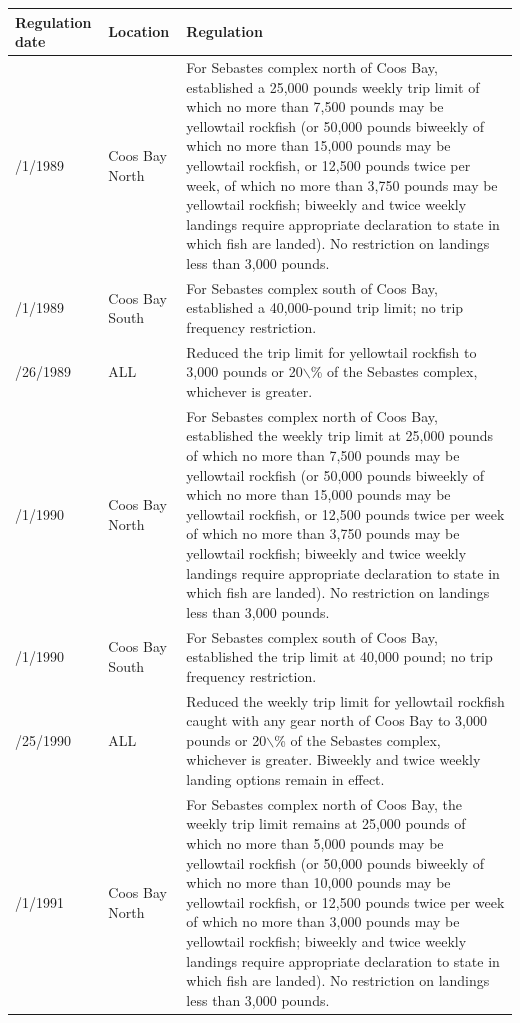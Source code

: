 \documentclass[12pt,]{article}
\begin{document}
\begin{tabular}{>{\centering}p{.60in}>{\centering}p{1.0in}>{\raggedright}p{4.20in}}
  \hline
Regulation date & Location & Regulation \\ 
  \hline
1/1/1989 & Coos Bay North & For Sebastes complex north of Coos Bay, established a 25,000 pounds weekly trip limit of which no more than 7,500 pounds may be yellowtail rockfish (or 50,000 pounds biweekly of which no more than 15,000 pounds may be yellowtail rockfish, or 12,500 pounds twice per week, of which no more than 3,750 pounds may be yellowtail rockfish; biweekly and twice weekly landings require appropriate declaration to state in which fish are landed). No restriction on landings less than 3,000 pounds.  \\ 
  1/1/1989 & Coos Bay South & For Sebastes complex south of Coos Bay, established a 40,000-pound trip limit; no trip frequency restriction.  \\ 
  7/26/1989 & ALL & Reduced the trip limit for yellowtail rockfish to 3,000 pounds or 20$\backslash$\% of the Sebastes complex, whichever is greater.  \\ 
  1/1/1990 & Coos Bay North & For Sebastes complex north of Coos Bay, established the weekly trip limit at 25,000 pounds of which no more than 7,500 pounds may be yellowtail rockfish (or 50,000 pounds biweekly of which no more than 15,000 pounds may be yellowtail rockfish, or 12,500 pounds twice per week of which no more than 3,750 pounds may be yellowtail rockfish; biweekly and twice weekly landings require appropriate declaration to state in which fish are landed).  No restriction on landings less than 3,000 pounds. \\ 
  1/1/1990 & Coos Bay South & For Sebastes complex south of Coos Bay, established the trip limit at 40,000 pound; no trip frequency restriction. \\ 
  7/25/1990 & ALL & Reduced the weekly trip limit for yellowtail rockfish caught with any gear north of Coos Bay to 3,000 pounds or 20$\backslash$\% of the Sebastes complex, whichever is greater.  Biweekly and twice weekly landing options remain in effect. \\ 
  1/1/1991 & Coos Bay North & For Sebastes complex north of Coos Bay, the weekly trip limit remains at 25,000 pounds of which no more than 5,000 pounds may be yellowtail rockfish (or 50,000 pounds biweekly of which no more than 10,000 pounds may be yellowtail rockfish, or 12,500 pounds twice per week of which no more than 3,000 pounds may be yellowtail rockfish; biweekly and twice weekly landings require appropriate declaration to state in which fish are landed).  No restriction on landings less than 3,000 pounds. \\ 

\end{tabular}
\end{document}
